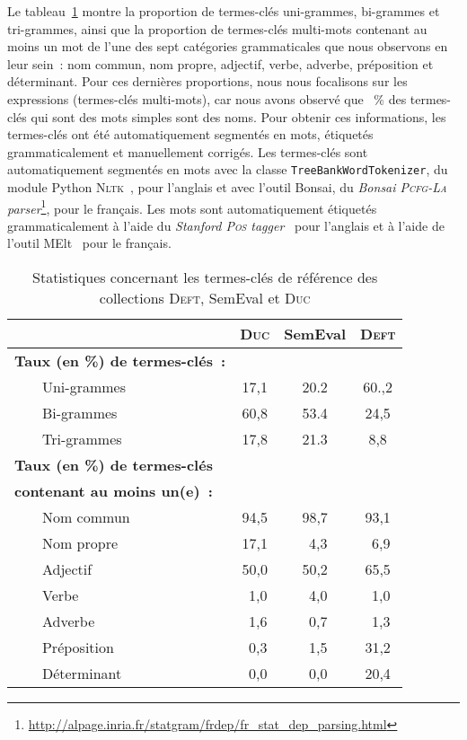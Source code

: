       Le tableau~\ref{tab:candidate_selection-train_stats} montre la proportion
      de termes-clés uni-grammes, bi-grammes et tri-grammes, ainsi que la
      proportion de termes-clés multi-mots contenant au moins un mot de l'une
      des sept catégories grammaticales que nous observons en leur sein~: nom
      commun, nom propre, adjectif, verbe, adverbe, préposition et déterminant.
      Pour ces dernières proportions, nous nous focalisons sur les expressions
      (termes-clés multi-mots), car nous avons observé que \TODO{\dots}~\% des
      termes-clés qui sont des mots simples sont des noms. Pour obtenir ces
      informations, les termes-clés ont été automatiquement segmentés en mots,
      étiquetés grammaticalement et manuellement corrigés. Les termes-clés sont
      automatiquement segmentés en mots avec la classe
      \texttt{TreeBankWordTokenizer}, du module Python
      \textsc{Nltk}~\cite[\textit{Natural Language ToolKit}]{bird2009nltk}, pour
      l'anglais et avec l'outil Bonsai, du \textit{Bonsai \textsc{Pcfg-La}
      parser}\footnote{\url{http://alpage.inria.fr/statgram/frdep/fr_stat_dep_parsing.html}},
      pour le français. Les mots sont automatiquement étiquetés grammaticalement
      à l'aide du \textit{Stanford \textsc{Pos}
      tagger}~\cite{toutanova2003stanfordpostagger} pour l'anglais et à l'aide
      de l'outil MElt~\cite{denis2009melt} pour le français.
      \begin{table}[!h]
        \centering
        \begin{tabular}{ll|ccc}
          \toprule
          & & \textbf{\textsc{Duc}} & \textbf{SemEval} & \textbf{\textsc{Deft}}\\
          \hline
          \multicolumn{2}{l|}{\textbf{Taux (en \%) de termes-clés~:}}\\
          & Uni-grammes & 17,1 & 20.2 & 60.,2\\
          & Bi-grammes & 60,8 & 53.4 & 24,5\\
          & Tri-grammes & 17,8 & 21.3 & 8,8\\
          \hline
          \multicolumn{2}{l|}{\textbf{Taux (en \%) de termes-clés}} & & &\\
          \multicolumn{2}{l|}{\textbf{contenant au moins un(e)~:}} & & &\\
          & Nom commun & 94,5 & 98,7 & 93,1\\
          & Nom propre & 17,1 & $~~$4,3 & $~~$6,9\\
          & Adjectif & 50,0 & 50,2 & 65,5\\
          & Verbe & $~~$1,0 & $~~$4,0 & $~~$1,0\\
          & Adverbe & $~~$1,6 & $~~$0,7 & $~~$1,3\\
          & Préposition & $~~$0,3 & $~~$1,5 & 31,2\\
          & Déterminant & $~~$0,0 & $~~$0,0 & 20,4\\
          \bottomrule
        \end{tabular}
        \caption{Statistiques concernant les termes-clés de référence des
                 collections \textsc{Deft}, SemEval et \textsc{Duc}
                 \label{tab:candidate_selection-train_stats}}
      \end{table}

